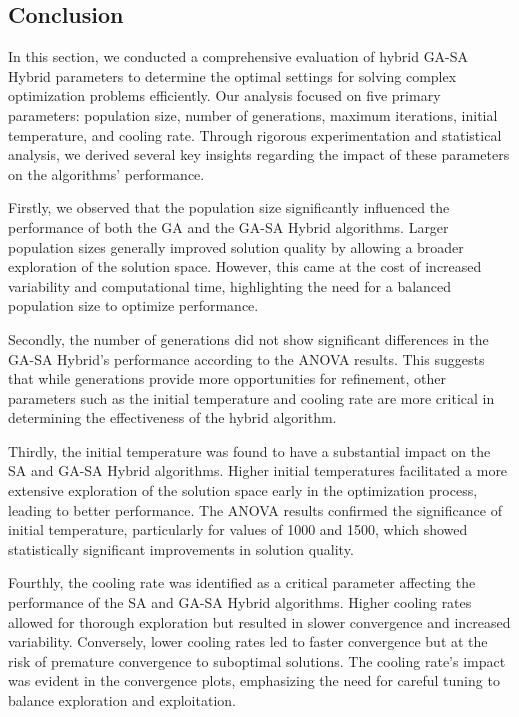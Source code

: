 \documentclass{article}
\begin{document}
    \subsection{Conclusion}

    In this section, we conducted a comprehensive evaluation of hybrid GA-SA Hybrid parameters to determine the optimal settings for solving complex optimization problems efficiently. Our analysis focused on five primary parameters: population size, number of generations, maximum iterations, initial temperature, and cooling rate. Through rigorous experimentation and statistical analysis, we derived several key insights regarding the impact of these parameters on the algorithms' performance.

    Firstly, we observed that the population size significantly influenced the performance of both the GA and the GA-SA Hybrid algorithms. Larger population sizes generally improved solution quality by allowing a broader exploration of the solution space. However, this came at the cost of increased variability and computational time, highlighting the need for a balanced population size to optimize performance.

    Secondly, the number of generations did not show significant differences in the GA-SA Hybrid's performance according to the ANOVA results. This suggests that while generations provide more opportunities for refinement, other parameters such as the initial temperature and cooling rate are more critical in determining the effectiveness of the hybrid algorithm.

    Thirdly, the initial temperature was found to have a substantial impact on the SA and GA-SA Hybrid algorithms. Higher initial temperatures facilitated a more extensive exploration of the solution space early in the optimization process, leading to better performance. The ANOVA results confirmed the significance of initial temperature, particularly for values of 1000 and 1500, which showed statistically significant improvements in solution quality.

    Fourthly, the cooling rate was identified as a critical parameter affecting the performance of the SA and GA-SA Hybrid algorithms. Higher cooling rates allowed for thorough exploration but resulted in slower convergence and increased variability. Conversely, lower cooling rates led to faster convergence but at the risk of premature convergence to suboptimal solutions. The cooling rate's impact was evident in the convergence plots, emphasizing the need for careful tuning to balance exploration and exploitation.
\end{document}
